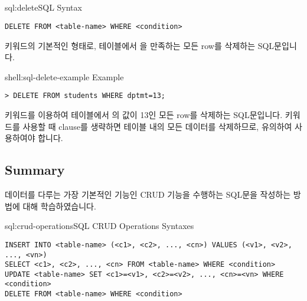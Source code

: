 \subsection*{}

\begin{sqlenv}{sql:delete}{SQL  Syntax}\begin{verbatim}
DELETE FROM <table-name> WHERE <condition>
\end{verbatim}
\end{sqlenv}

\는  키워드의 기본적인 형태로,  테이블에서 을 만족하는 모든 row를 삭제하는 SQL문입니다.

\begin{shellenv}{shell:sql-delete-example}{ Example}\begin{verbatim}
> DELETE FROM students WHERE dptmt=13;
\end{verbatim}
\end{shellenv}

\은  키워드를 이용하여  테이블에서 의 값이 13인 모든 row를 삭제하는 SQL문입니다.  키워드를 사용할 때  clause를 생략하면 테이블 내의 모든 데이터를 삭제하므로, 유의하여 사용하여야 합니다.

\subsection*{Summary}

데이터를 다루는 가장 기본적인 기능인 CRUD 기능을 수행하는 SQL문을 작성하는 방법에 대해 학습하였습니다.

\begin{sqlenv}{sql:crud-operations}{SQL CRUD Operations Syntaxes}\begin{verbatim}
INSERT INTO <table-name> (<c1>, <c2>, ..., <cn>) VALUES (<v1>, <v2>, ..., <vn>)
SELECT <c1>, <c2>, ..., <cn> FROM <table-name> WHERE <condition>
UPDATE <table-name> SET <c1>=<v1>, <c2>=<v2>, ..., <cn>=<vn> WHERE <condition>
DELETE FROM <table-name> WHERE <condition>
\end{verbatim}
\end{sqlenv}
